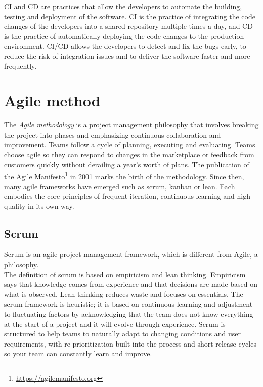 CI and CD are practices that allow the developers to automate the building, testing and deployment of the software. CI is the practice of integrating the code changes of the developers into a shared repository multiple times a day, and CD is the practice of automatically deploying the code changes to the production environment. CI/CD allows the developers to detect and fix the bugs early, to reduce the risk of integration issues and to deliver the software faster and more frequently.


\section{Agile method}

The \textit{Agile methodology} is a project management philosophy that involves breaking the project into phases and emphasizing continuous collaboration and improvement. Teams follow a cycle of planning, executing and evaluating. Teams choose agile so they can respond to changes in the marketplace or feedback from customers quickly without derailing a year's worth of plans. The publication of the Agile Manifesto\footnote{\url{https://agilemanifesto.org}} in 2001 marks the birth of the methodology. Since then, many agile frameworks have emerged such as scrum, kanban or lean. Each embodies the core principles of frequent iteration, continuous learning and high quality in its own way.~\cite{agile-methodology}

\subsection{Scrum}

Scrum is an agile project management framework, which is different from Agile, a philosophy.\\
The definition of scrum is based on empiricism and lean thinking. Empiricism says that knowledge comes from experience and that decisions are made based on what is observed. Lean thinking reduces waste and focuses on essentials. The scrum framework is heuristic; it is based on continuous learning and adjustment to fluctuating factors by acknowledging that the team does not know everything at the start of a project and it will evolve through experience. Scrum is structured to help teams to naturally adapt to changing conditions and user requirements, with re-prioritization built into the process and short release cycles so your team can constantly learn and improve.~\cite{scrum}

